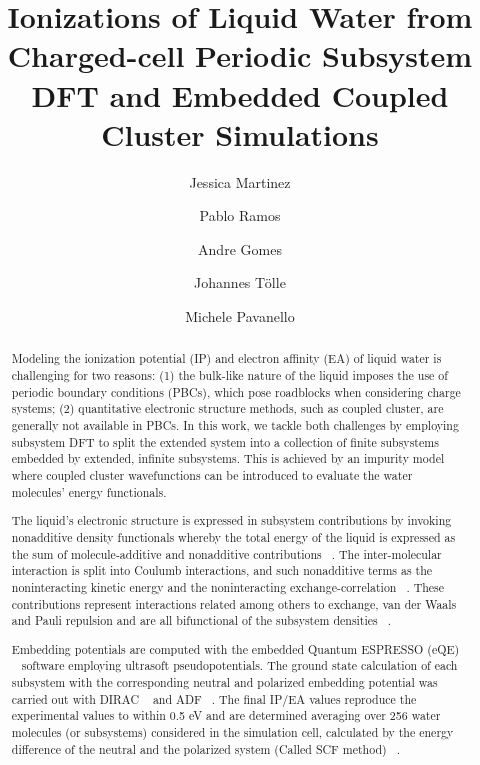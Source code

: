 \documentclass[12pt,a4paper]{article}
\begin{document}
\title{Ionizations of Liquid Water from Charged-cell Periodic Subsystem DFT and Embedded Coupled Cluster Simulations}
\author[1]{Jessica Martinez}
\author[1]{Pablo Ramos}
\author[2]{Andre Gomes}
\author[3]{Johannes Tölle}
\author[1]{Michele Pavanello}
\date{}
\setcounter{Maxaffil}{0}
\renewcommand\Affilfont{\itshape\small}
\begin{titlepage}
  \maketitle
\end{titlepage}

\begin{abstract}
Modeling the ionization potential (IP) and electron affinity (EA) of liquid water is challenging for
two reasons: (1) the bulk-like nature of the liquid imposes the use of periodic boundary conditions
(PBCs), which pose roadblocks when considering charge systems; (2) quantitative electronic structure
methods, such as coupled cluster, are generally not available in PBCs. In this work, we tackle both
challenges by employing subsystem DFT to split the extended system into a collection of finite
subsystems embedded by extended, infinite subsystems. This is achieved by an impurity
model ~\cite{tolle2019charged} where coupled cluster wavefunctions can be introduced to evaluate
the water molecules’ energy functionals. 

The liquid’s electronic structure is expressed in subsystem contributions by invoking nonadditive density 
functionals whereby the total energy of the liquid is expressed as the sum of molecule-additive
and nonadditive contributions ~\cite{martyna1999reciprocal}. The inter-molecular interaction is
split into Coulumb interactions, and such nonadditive terms as the noninteracting
kinetic energy and the noninteracting exchange-correlation ~\cite{krishtal2015subsystem}. 
These contributions represent interactions related among others to exchange, van der Waals and
Pauli repulsion and are all bifunctional of the subsystem densities ~\cite{tolle2019charged}. 

Embedding potentials are computed with the embedded Quantum ESPRESSO (eQE) ~\cite{genova2017eqe} 
software employing ultrasoft pseudopotentials. The ground state calculation of each subsystem with
the corresponding neutral and polarized embedding potential was carried out with 
DIRAC ~\cite{saue2020dirac} and ADF ~\cite{te2001chemistry}. The final IP/EA values reproduce the
experimental values to within 0.5 eV and are determined averaging over 256 water molecules
(or subsystems) considered in the simulation cell, calculated by the energy difference of the
neutral and the polarized system (Called SCF method) ~\cite{bagus1965self,waskom2017mwaskom}. 
\end{abstract}
\end{document}
